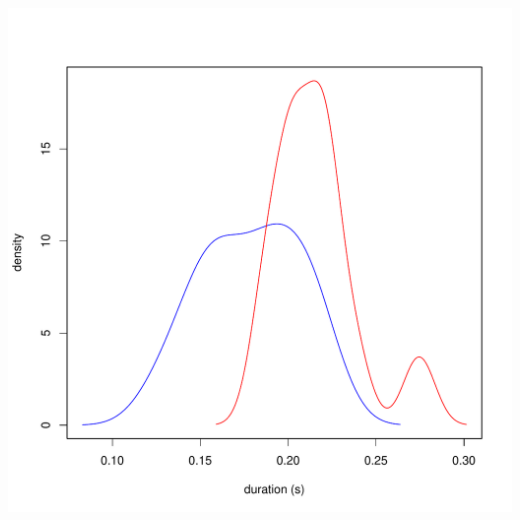\documentclass[a4paper,11pt]{article}\usepackage[]{graphicx}\usepackage[]{color}
\makeatletter
\def\maxwidth{ %
  \ifdim\Gin@nat@width>\linewidth
    \linewidth
  \else
    \Gin@nat@width
  \fi
}
\newenvironment{knitrout}{}{} %
\makeatother
\begin{document}
\begin{knitrout}
{\centering \includegraphics[width=\maxwidth]{img/mono-lat-dens-1} 

}



\end{knitrout}
\end{document}
